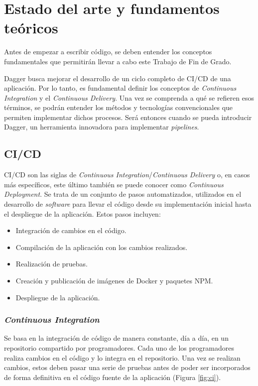 \chapter{Estado del arte y fundamentos teóricos}

Antes de empezar a escribir código, se deben entender los conceptos fundamentales que permitirán llevar a cabo este Trabajo de Fin de Grado.

Dagger busca mejorar el desarrollo de un ciclo completo de CI/CD de una aplicación. Por lo tanto, es fundamental definir los conceptos de \textit{Continuous Integration} y el \textit{Continuous Delivery}. Una vez se comprenda a qué se refieren esos términos, se podrán entender los métodos y tecnologías convencionales que permiten implementar dichos procesos. Será entonces cuando se pueda introducir Dagger, un herramienta innovadora para implementar \textit{pipelines}.

\section{CI/CD}

CI/CD son las siglas de \textit{Continuous Integration}/\textit{Continuous Delivery} o, en casos más específicos, este último también se puede conocer como \textit{Continuous Deployment}. Se trata de un conjunto de pasos automatizados, utilizados en el desarrollo de \textit{software} para llevar el código desde su implementación inicial hasta el despliegue de la aplicación. Estos pasos incluyen:

\begin{itemize}
  \item Integración de cambios en el código.
  \item Compilación de la aplicación con los cambios realizados.
  \item Realización de pruebas.
  \item Creación y publicación de imágenes de Docker y paquetes NPM.
  \item Despliegue de la aplicación.
\end{itemize}

\subsection*{\textit{Continuous Integration}}
\label{subsec:CI}

Se basa en la integración de código de manera constante, día a día, en un repositorio compartido por programadores. Cada uno de los programadores realiza cambios en el código y lo integra en el repositorio. Una vez se realizan cambios, estos deben pasar una serie de pruebas antes de poder ser incorporados de forma definitiva en el código fuente de la aplicación (Figura \ref{fig:ci}).

